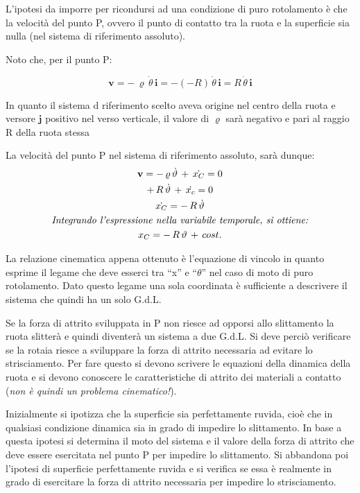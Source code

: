		L'ipotesi da imporre per ricondursi ad una condizione di puro rotolamento è che la velocità del punto P, ovvero il punto di contatto tra la ruota e la superficie sia nulla (nel sistema di riferimento assoluto).
		
		Noto che, per il punto P:
		
		\[
		\mathbf{v}=-\,\varrho\,\dot{\theta}\,\mathbf{i} = - (-R)\,\dot{\theta}\,\mathbf{i} = R\,\dot{\theta}\,\mathbf{i}
		\]
		
		In quanto il sistema d riferimento scelto aveva origine nel centro della ruota e versore $\mathbf{j}$ positivo nel verso verticale, il valore di $\varrho$ sarà negativo e pari al raggio R della ruota stessa
		
		La velocità del punto P nel sistema di riferimento assoluto, sarà dunque:
		\begin{gather*}
		\mathbf{v} = -\,\varrho\,\dot{\theta}\,+\,\dot{x_C} = 0\\
		+\,R\,\dot{\theta}\,+\,\dot{x_c} = 0\\
		\dot{x_C} = -\,R\,\dot{\theta}\\
		\emph{Integrando l'espressione nella variabile temporale, si ottiene:}\\
		x_C = -\,R\,\theta\,+\,cost.
		\end{gather*}
		
		La relazione cinematica appena ottenuto è l'equazione di vincolo in quanto esprime il legame che deve esserci tra ``x'' e ``$\theta$'' nel caso di moto di puro rotolamento. Dato questo legame una sola coordinata è sufficiente a descrivere il sistema che quindi ha un solo G.d.L.
		
		Se la forza di attrito sviluppata in P non riesce ad opporsi allo slittamento la ruota slitterà e quindi diventerà un sistema a due G.d.L.  Si deve perciò verificare se la rotaia riesce a sviluppare la forza di attrito necessaria ad evitare lo strisciamento. Per fare questo si devono scrivere le equazioni della dinamica della ruota e si devono conoscere le caratteristiche di attrito dei materiali a contatto (\emph{non è quindi un problema cinematico!}).
		
		Inizialmente si ipotizza che la superficie sia perfettamente ruvida, cioè che in qualsiasi condizione dinamica sia in grado di impedire lo slittamento. In base a questa ipotesi si determina il moto del sistema e il valore della forza di attrito che deve essere esercitata nel punto P per impedire lo slittamento. Si abbandona poi l'ipotesi di superficie perfettamente ruvida e si verifica se essa è realmente in grado di esercitare la forza di attrito necessaria per impedire lo strisciamento.
		
